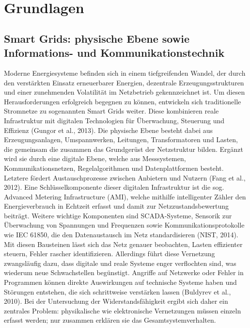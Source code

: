 
\section{Grundlagen}
\subsection{Smart Grids: physische Ebene sowie Informations- und Kommunikationstechnik}
Moderne Energiesysteme befinden sich in einem tiefgreifenden Wandel, der durch den verstärkten Einsatz erneuerbarer Energien, dezentrale Erzeugungsstrukturen und einer zunehmenden Volatilität im Netzbetrieb gekennzeichnet ist. Um diesen Herausforderungen erfolgreich begegnen zu können, entwickeln sich traditionelle Stromnetze zu sogenannten Smart Grids weiter. Diese kombinieren reale Infrastruktur mit digitalen Technologien für Überwachung, Steuerung und Effizienz (Gungor et al., 2013). Die physische Ebene besteht dabei aus Erzeugungsanlagen, Umspannwerken, Leitungen, Transformatoren und Lasten, die gemeinsam die zusammen das Grundgerüst der Netzstruktur bilden. Ergänzt wird sie durch eine digitale Ebene, welche aus Messsystemen, Kommunikationsnetzen, Regelalgorithmen und Datenplattformen besteht. Letztere fördert Austauschprozesse zwischen Anbietern und Nutzern (Fang et al., 2012).
Eine Schlüsselkomponente dieser digitalen Infrastruktur ist die sog. Advanced Metering Infrastructure (AMI), welche mithilfe intelligenter Zähler den Energieverbrauch in Echtzeit erfasst und damit zur Netzzustandsbewertung beiträgt. Weitere wichtige Komponenten sind SCADA-Systeme, Sensorik zur Überwachung von Spannungen und Frequenzen sowie Kommunikationsprotokolle wie IEC 61850, die den Datenaustausch im Netz standardisieren (NIST, 2014). Mit diesen Bausteinen lässt sich das Netz genauer beobachten, Lasten effizienter steuern, Fehler rascher identifizieren. Allerdings führt diese Vernetzung zwangsläufig dazu, dass digitale und reale Systeme enger verflochten sind, was wiederum neue Schwachstellen begünstigt. Angriffe auf Netzwerke oder Fehler in Programmen können direkte Auswirkungen auf technische Systeme haben und Störungen entstehen, die sich schrittweise verstärken lassen (Buldyrev et al., 2010). Bei der Untersuchung der Widerstandsfähigkeit ergibt sich daher ein zentrales Problem: physikalische wie elektronische Vernetzungen müssen einzeln erfasst werden; nur zusammen erklären sie das Gesamtsystemverhalten.

